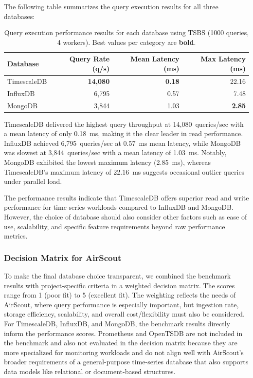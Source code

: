 The following table summarizes the query execution results for all three
databases:

\begin{table}[ht!]
    \centering
    \begin{tabular}{|l|r|r|r|} %
        \hline %
        \textbf{Database} & \textbf{Query Rate (q/s)} & \textbf{Mean Latency (ms)} & \textbf{Max Latency (ms)} \\
        \hline %
        TimescaleDB       & \textbf{14,080}           & \textbf{0.18}              & 22.16                     \\
        InfluxDB          & 6,795                     & 0.57                       & 7.48                      \\
        MongoDB           & 3,844                     & 1.03                       & \textbf{2.85}             \\
        \hline %
    \end{tabular}
    \caption{Query execution performance results for each database using TSBS (1000 queries, 4 workers). Best values per category are \textbf{bold}.}\label{tab:tsbs-query-results}
\end{table}

TimescaleDB delivered the highest query throughput at 14,080~queries/sec with a
mean latency of only 0.18~ms, making it the clear leader in read performance.
InfluxDB achieved 6,795~queries/sec at 0.57~ms mean latency, while MongoDB was
slowest at 3,844~queries/sec with a mean latency of 1.03~ms. Notably, MongoDB
exhibited the lowest maximum latency (2.85~ms), whereas TimescaleDB's maximum
latency of 22.16~ms suggests occasional outlier queries under parallel load.

The performance results indicate that TimescaleDB offers superior read and
write performance for time-series workloads compared to InfluxDB and MongoDB\@.
However, the choice of database should also consider other factors such as ease
of use, scalability, and specific feature requirements beyond raw performance
metrics.

\subsubsection{Decision Matrix for AirScout}

To make the final database choice transparent, we combined the benchmark
results with project-specific criteria in a weighted decision matrix. The
scores range from 1 (poor fit) to 5 (excellent fit). The weighting reflects the
needs of AirScout, where query performance is especially important, but
ingestion rate, storage efficiency, scalability, and overall cost/flexibility
must also be considered. For TimescaleDB, InfluxDB, and MongoDB, the benchmark
results directly inform the performance scores. Prometheus and OpenTSDB are not
included in the benchmark and also not evaluated in the decision matrix because
they are more specialized for monitoring workloads and do not align well with
AirScout's broader requirements of a general-purpose time-series database that
also supports data models like relational or document-based structures.

